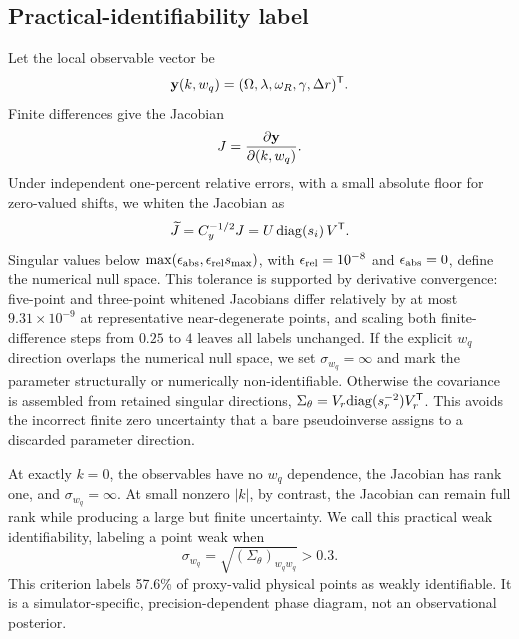 \documentclass[conference]{IEEEtran}
\newcommand{\wq}{w_q}
\newcommand{\sigw}{\sigma_{w_q}}
\begin{document}
\subsection{Practical-identifiability label}
Let the local observable vector be
\begin{equation}
 {\bf y}(k,\wq)=(\Omega,\lambda,\omega_R,\gamma,\Delta r)^{\mathsf T}.
\end{equation}
Finite differences give the Jacobian
\begin{equation}
 J=\frac{\partial{\bf y}}{\partial(k,\wq)} .
\end{equation}
Under independent one-percent relative errors, with a small absolute floor for
zero-valued shifts, we whiten the Jacobian as
\begin{equation}
 \widetilde J=C_y^{-1/2}J=U\,{\rm diag}(s_i)\,V^{\mathsf T}.
\label{eq:fisher}
\end{equation}
Singular values below
$\max(\epsilon_{\rm abs},\epsilon_{\rm rel}s_{\max})$, with
$\epsilon_{\rm rel}=10^{-8}$ and $\epsilon_{\rm abs}=0$, define the numerical
null space. This tolerance is supported by derivative convergence: five-point
and three-point whitened Jacobians differ relatively by at most
$9.31\times10^{-9}$ at representative near-degenerate points, and scaling both
finite-difference steps from $0.25$ to $4$ leaves all labels unchanged. If the
explicit $\wq$ direction overlaps the numerical null space, we set
$\sigw=\infty$ and mark the parameter structurally or numerically
non-identifiable. Otherwise the covariance is assembled from retained
singular directions,
$\Sigma_\theta=V_r{\rm diag}(s_r^{-2})V_r^{\mathsf T}$. This avoids the
incorrect finite zero uncertainty that a bare pseudoinverse assigns to a
discarded parameter direction.

At exactly $k=0$, the observables have no $\wq$ dependence, the Jacobian has
rank one, and $\sigw=\infty$. At small nonzero $|k|$, by contrast, the
Jacobian can remain full rank while producing a large but finite uncertainty.
We call this practical weak identifiability, labeling a point weak when
\begin{equation}
 \sigw=\sqrt{(\Sigma_\theta)_{\wq\wq}}>0.3 .
 \label{eq:weak}
\end{equation}
This criterion labels 57.6\% of proxy-valid physical points as weakly
identifiable. It is a simulator-specific, precision-dependent phase diagram,
not an observational posterior.
\end{document}
